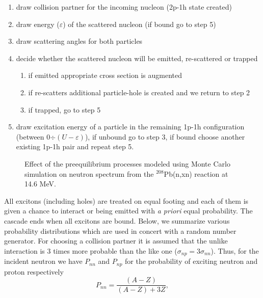 \begin{enumerate}
\item draw collision partner for the incoming nucleon (2p-1h state created)

\item draw energy ($\varepsilon$) of the scattered nucleon (if bound go to
step 5)

\item draw scattering angles for both particles

\item decide whether the scattered nucleon will be emitted, re-scattered or
trapped

\begin{enumerate}
\item if emitted appropriate cross section is augmented

\item if re-scatters additional particle-hole is created and we return to
step 2

\item if trapped, go to step 5
\end{enumerate}

\item draw excitation energy of a particle in the remaining 1p-1h
configuration (between 0$\div(U-\varepsilon)$), if unbound go to step 3, if
bound choose another existing 1p-1h pair and repeat step 5.
\end{enumerate}

\begin{figure}[htbp]
\caption{Effect of the preequilibrium processes modeled using Monte Carlo
simulation on neutron spectrum from the $^{208}$Pb(n,xn) reaction at 14.6
MeV.}
\label{pb208HMS}
\end{figure}

All excitons (including holes) are treated on equal footing and each of them
is given a chance to interact or being emitted with \emph{a priori} equal
probability. The cascade ends when all excitons are bound. Below, we
summarize various probability distributions which are used in concert with a
random number generator. For choosing a collision partner it is assumed that
the unlike interaction is 3 times more probable than the like one ($%
\sigma_{np}=3\sigma_{nn}$). Thus, for the incident neutron we have $P_{nn}$
and $P_{np}$ for the probability of exciting neutron and proton respectively
\begin{equation}
P_{nn}=%
\frac{(A-Z)}{(A-Z)+3Z},  \label{Pnn}
\end{equation}

